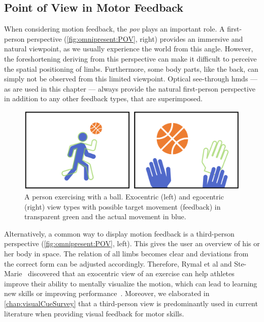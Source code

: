 \subsection{Point of View in Motor Feedback\label{sec:omnipresent:POV}}
When considering motion feedback, the \emph{\acrshort{pov}} plays an important role. A first-person perspective (\autoref{fig:omnipresent:POV}, right) provides an immersive and natural viewpoint, as we usually experience the world from this angle. However, the foreshortening deriving from this perspective can make it difficult to perceive the spatial positioning of limbs. Furthermore, some body parts, like the back, can simply not be observed from this limited viewpoint. 
Optical see-through \acrshort{hmd}s --- as are used in this chapter --- always provide the natural first-person perspective in addition to any other feedback types, that are superimposed.

\begin{figure}[h!]
	\centering
	\includegraphics[width=\linewidth]{pictures/PointOfView.PNG}
	\caption{A person exercising with a ball. Exocentric (left) and egocentric (right) view types with possible target movement (feedback) in transparent green and the actual movement in blue.\label{fig:omnipresent:POV}}
\end{figure}

Alternatively, a common way to display motion feedback is a third-person perspective (\autoref{fig:omnipresent:POV}, left). This gives the user an overview of his or her body in space. The relation of all limbs becomes clear and deviations from the correct form can be adjusted accordingly. Therefore, Rymal et al and Ste-Marie~\cite{rymal2009dsm} discovered that an exocentric view of an exercise can help athletes improve their ability to mentally visualize the motion, which can lead to learning new skills or improving performance~\cite{white1998ida}. Moreover, we elaborated in \autoref{chap:visualCueSurvey} that a third-person view is predominantly used in current literature when providing visual feedback for motor skills.

